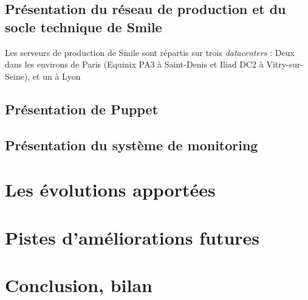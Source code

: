 \documentclass[12 pt]{report}
\begin{document}
\section{Présentation du réseau de production et du socle technique de Smile}

Les serveurs de production de Smile sont répartis sur trois \emph{datacenters} : Deux dans les environs de Paris (Equinix PA3 à Saint-Denis et Iliad DC2 à Vitry-sur-Seine), et un à Lyon 

\section{Présentation de Puppet}
\lipsum
\section{Présentation du système de monitoring}
\lipsum
\chapter{Les évolutions apportées}

\lipsum
\lipsum
\lipsum

\chapter{Pistes d'améliorations futures}
\lipsum

\chapter{Conclusion, bilan}
\lipsum
\end{document}
